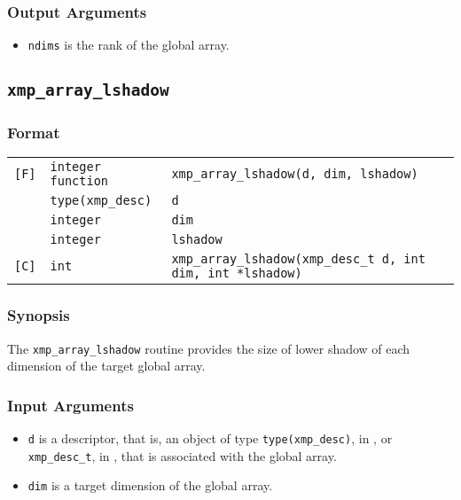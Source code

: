 \subsubsection*{Output Arguments}
\begin{itemize}
 \item {\tt ndims} is the rank of the global array.
\end{itemize}


\subsection{\tt xmp\_array\_lshadow}

\subsubsection*{Format}

\begin{tabular}{lll}

\verb![F]!& {\tt integer function}& {\tt xmp\_array\_lshadow(d, dim, lshadow)}\\
          & {\tt type(xmp\_desc)} & {\tt d}\\
          & {\tt integer} & {\tt dim}\\
          & {\tt integer} & {\tt lshadow}\\

\verb![C]!&  {\tt int}& {\tt xmp\_array\_lshadow(xmp\_desc\_t d, int dim, int *lshadow)}\\

\end{tabular}

\subsubsection*{Synopsis}

The {\tt xmp\_array\_lshadow} routine provides the size of lower shadow of each dimension of the target global array.


\subsubsection*{Input Arguments}
\begin{itemize}
 \item {\tt d} is a descriptor, that is, an object of type 
       {\tt type(xmp\_desc)}, in {\XMPF}, or {\tt xmp\_desc\_t},
       in {\XMPC}, that is associated with the global array.
 \item {\tt dim} is a target dimension of the global array.
\end{itemize}

